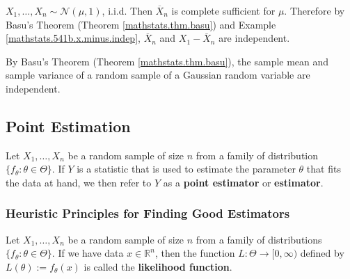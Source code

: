 \begin{example}

\(X_1, \ldots, X_n \sim \mathcal{N}(\mu, 1)\), i.i.d. Then \(\overline{X}_n\) is complete sufficient for \(\mu\). Therefore by Basu's Theorem (Theorem \ref{mathstats.thm.basu}) and Example \ref{mathstats.541b.x.minus.indep}, \(\overline{X}_n\) and \(X_1 - \overline{X}_n\) are independent.

\end{example}

\begin{example}

By Basu's Theorem (Theorem \ref{mathstats.thm.basu}), the sample mean and sample variance of a random sample of a Gaussian random variable are independent.

\end{example}

\subsection{Point Estimation}

\begin{definition} Let \(X_1, \ldots, X_n\) be a random sample of size \(n\) from a family of distribution \(\{f_\theta: \theta \in \Theta\}\). If \(Y\) is a statistic that is used to estimate the parameter \(\theta\) that fits the data at hand, we then refer to \(Y\) as a \textbf{point estimator} or \textbf{estimator}.

\end{definition}

\subsubsection{Heuristic Principles for Finding Good Estimators}

\begin{definition}Let \(X_1, \ldots, X_n\) be a random sample of size \(n\) from a family of distributions \(\{f_\theta: \theta \in \Theta\}\). If we have data \(x \in \mathbb{R}^n\), then the function \(L: \Theta \to [0, \infty)\) defined by \(L(\theta):= f_\theta(x)\) is called the \textbf{likelihood function}.

\end{definition}



